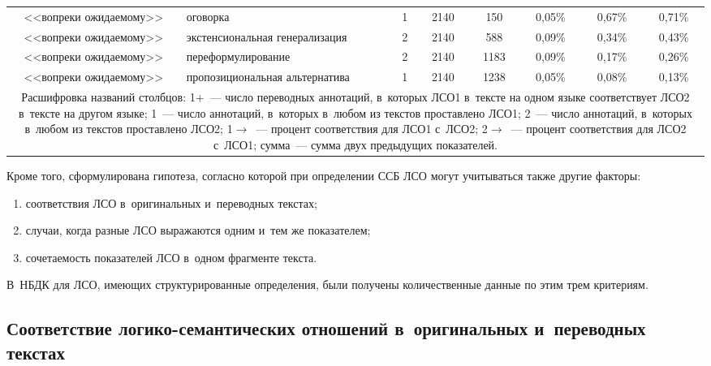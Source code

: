 \begin{multicols}{2}
\begin{table*}[b]
\begin{center}
\begin{tabular}{|c|l|c|c|c|c|c|c|}
<<вопреки ожидаемому>>&оговорка&\hphantom{9}1&2140&150&0,05\%&0,67\%&0,71\%\\
<<вопреки ожидаемому>>&экстенсиональная 
генерализация&\hphantom{9}2&2140&588&0,09\%&0,34\%&0,43\%\\
<<вопреки ожидаемому>>&переформулирование&\hphantom{9}2&2140&1183\hphantom{9}&0,09\%&0,17\%&0,26\%\\
<<вопреки ожидаемому>>&пропозициональная 
альтернатива&\hphantom{9}1&2140&1238\hphantom{9}&0,05\%&0,08\%&0,13\%\\
\hline
\multicolumn{8}{p{163mm}}{\footnotesize \hspace*{3mm}Расшифровка названий столбцов: 
1\;+\;2~--- число переводных аннотаций, в~которых ЛСО1 в~тексте на одном языке 
соответствует ЛСО2 в~тексте на другом языке; 1~--- число аннотаций, в~которых в~любом из 
текстов проставлено ЛСО1; 2~--- число аннотаций, в~которых в~любом из текстов 
проставлено ЛСО2; 1\;$\to$\;2~--- процент соответствия для ЛСО1 с~ЛСО2; 2\;$\to$\;1~--- 
процент соответствия для ЛСО2 с~ЛСО1; сумма~--- сумма двух предыдущих показателей.}
\end{tabular}
\end{center}
\end{table*}

  
  
  Кроме того, сформулирована гипотеза, согласно которой при определении 
ССБ ЛСО могут учитываться также другие 
факторы:
\begin{enumerate}[(1)] 
\item соответствия ЛСО в~оригинальных и~переводных текстах; 
\item случаи, когда разные ЛСО выражаются одним и~тем же показателем; 
\item сочетаемость показателей ЛСО в~одном фрагменте текста.
\end{enumerate}
 В~НБДК для 
ЛСО, имеющих структурированные определения, были получены 
количественные данные по этим трем критериям.

  
  
\subsection{Соответствие логико-семантических отношений в~оригинальных и~переводных текстах}


\end{multicols}
